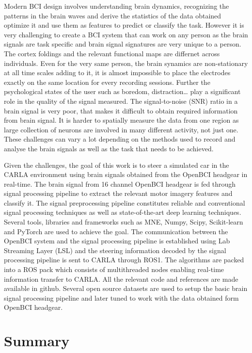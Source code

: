 Modern BCI design involves understanding brain dynamics, recognizing the patterns in the brain waves and derive the statistics of the data obtained
optimize it and use them as features to predict or classify the task. However it is very challenging to create a BCI system that can work on any person
as the brain signals are task specific and brain signal signatures are very unique to a person. The cortex foldings and the relevant functional maps are
differnet across individuals. Even for the very same person, the brain synamics are non-stationary at all time scales adding to it, it is almost impossible 
to place the electrodes exactly on the same location for every recording sessions. Further the psychological states of the user such as boredom, distraction\dots
play a significant role in the quality of the signal measured. The signal-to-noise (SNR) ratio in a brain signal is very poor, that makes it
difficult to obtain required information from brain signal. It is harder to spatially measure the data from one region as large collection of neurons
are involved in many different activity, not just one. These challenges can vary a lot depending on the methods used to record and analyse the brain signals
as well as the task that needs to be achieved.

Given the challenges, the goal of this work is to steer a simulated car in the CARLA environment using brain signals obtained from the OpenBCI headgear in real-time.
The brain signal from 16 channel OpenBCI headgear is fed through signal processing pipeline to extract the relevant motor imagery features and classify it.
The signal preprocessing pipeline constitutes reliable and conventional signal processing techniques as well as state-of-the-art deep learning techniques.
Several tools, libraries and frameworks such as MNE, Numpy, Scipy, Scikit-learn and PyTorch are used to achieve the goal.
The communication between the OpenBCI system and the signal processing pipeline is established using Lab Streaming Layer (LSL) and the steering information
decoded by the signal processing pipeline is sent to CARLA through ROS1. The algorithms are packed into a ROS pack which consists of multithreaded nodes enabling
real-time information transfer to CARLA. All the relevant code and references are made available in github. Several open source datasets are used to setup the basic 
brain signal processing pipeline and later tuned to work with the data obtained form OpenBCI headgear. 

\section*{Summary} 